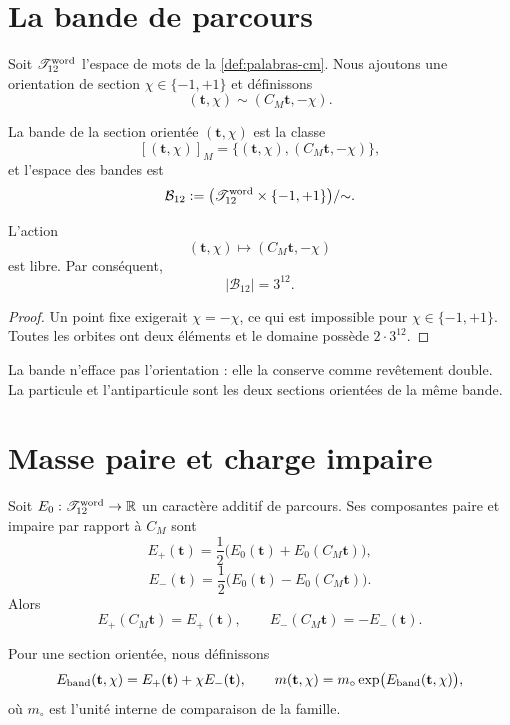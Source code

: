 \section{La bande de parcours}

Soit \(\mathscr T_{12}^{\rm word}\) l’espace de mots de la \cref{def:palabras-cm}. Nous ajoutons une orientation de section \(\chi\in\{-1,+1\}\) et définissons
\[
(\mathbf t,\chi)\sim(C_M\mathbf t,-\chi).
\]

\begin{definition}
\label{def:banda-dodecafasica-ruta} La bande de la section orientée \((\mathbf t,\chi)\) est la classe
\[
[(\mathbf t,\chi)]_M
=\{(\mathbf t,\chi),(C_M\mathbf t,-\chi)\},
\]
et l’espace des bandes est
\[
\mathcal B_{12}
:=
\bigl(\mathscr T_{12}^{\rm word}\times\{-1,+1\}\bigr)/{\sim}.
\]
\end{definition}

\begin{proposition}
\label{prop:accion-cm-orientada-libre}
L’action
\[
(\mathbf t,\chi)\longmapsto(C_M\mathbf t,-\chi)
\]
est libre. Par conséquent,
\[
|\mathcal B_{12}|=3^{12}.
\]
\end{proposition}

\begin{proof}
Un point fixe exigerait \(\chi=-\chi\), ce qui est impossible pour \(\chi\in\{-1,+1\}\). Toutes les orbites ont deux éléments et le domaine possède \(2\cdot3^{12}\).
\end{proof}

La bande n’efface pas l’orientation : elle la conserve comme revêtement double. La particule et l’antiparticule sont les deux sections orientées de la même bande.

\section{Masse paire et charge impaire}

Soit \(E_0:\mathscr T_{12}^{\rm word}\to\mathbb R\) un caractère additif de parcours. Ses composantes paire et impaire par rapport à \(C_M\) sont
\[
E_+(\mathbf t)
=\frac12\bigl(E_0(\mathbf t)+E_0(C_M\mathbf t)\bigr),
\]
\[
E_-(\mathbf t)
=\frac12\bigl(E_0(\mathbf t)-E_0(C_M\mathbf t)\bigr).
\]
Alors
\[
E_+(C_M\mathbf t)=E_+(\mathbf t),
\qquad
E_-(C_M\mathbf t)=-E_-(\mathbf t).
\]

\begin{definition}
\label{def:caracter-banda} Pour une section orientée, nous définissons
\[
E_{\rm band}(\mathbf t,\chi)
=E_+(\mathbf t)+\chi E_-(\mathbf t),
\qquad
m(\mathbf t,\chi)
=m_\circ\exp\bigl(E_{\rm band}(\mathbf t,\chi)\bigr),
\]
où \(m_\circ\) est l’unité interne de comparaison de la famille.
\end{definition}

